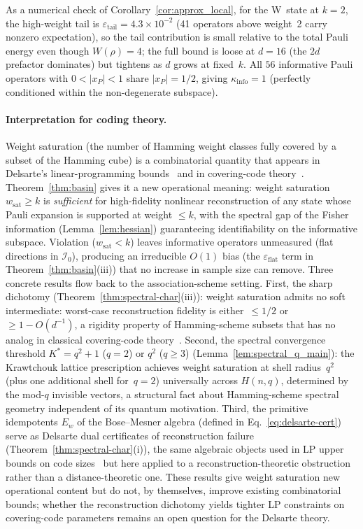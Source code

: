 \documentclass[twocolumn,prx,aps,superscriptaddress,longbibliography,floatfix]{revtex4-2}
\begin{document}
\noindent
As a numerical check of Corollary~\ref{cor:approx_local},
for the W~state at $k = 2$, the high-weight tail is
$\varepsilon_{\mathrm{tail}} = 4.3 \times 10^{-2}$
(41 operators above weight~2 carry nonzero expectation),
so the tail contribution is small relative to the total
Pauli energy even though $W(\rho) = 4$; the full bound is
loose at $d = 16$ (the $2d$ prefactor dominates) but
tightens as $d$ grows at fixed~$k$.
All $56$ informative Pauli operators with
$0 < |x_P| < 1$ share $|x_P| = 1/2$, giving
$\kappa_{\mathrm{info}} = 1$ (perfectly conditioned
within the non-degenerate subspace).

\paragraph{Interpretation for coding theory.}
Weight saturation (the number of Hamming weight classes fully
covered by a subset of the Hamming cube) is a combinatorial
quantity that appears in Delsarte's linear-programming
bounds~\cite{Delsarte1973,BannaiIto1984} and in covering-code
theory~\cite{MacWilliams1977}.
Theorem~\ref{thm:basin} gives it a new operational meaning:
weight saturation $w_{\mathrm{sat}} \ge k$ is \emph{sufficient}
for high-fidelity nonlinear reconstruction of any state whose Pauli
expansion is supported at weight $\le k$, with the spectral gap of
the Fisher information (Lemma~\ref{lem:hessian}) guaranteeing
identifiability on the informative subspace.  Violation ($w_{\mathrm{sat}} < k$) leaves
informative operators unmeasured (flat directions in
$\mathcal{I}_0$), producing an irreducible $O(1)$ bias
(the $\varepsilon_{\mathrm{flat}}$ term in
Theorem~\ref{thm:basin}(iii)) that no increase in sample size
can remove.
Three concrete results flow back to the association-scheme
setting.  First, the sharp dichotomy
(Theorem~\ref{thm:spectral-char}(iii)): weight saturation
admits no soft intermediate: worst-case reconstruction fidelity
is either~$\le 1/2$ or~$\ge 1 - O(d^{-1})$, a rigidity
property of Hamming-scheme subsets that has no analog in
classical covering-code
theory~\cite{Delsarte1973,MacWilliams1977}.
Second, the spectral convergence threshold $K^* = q^2 + 1$ ($q = 2$)
or $q^2$ ($q \ge 3$)
(Lemma~\ref{lem:spectral_q_main}): the Krawtchouk lattice
prescription achieves weight saturation at shell radius~$q^2$
(plus one additional shell for~$q = 2$)
universally across $H(n,q)$, determined by the mod-$q$ invisible
vectors, a structural fact about Hamming-scheme spectral geometry
independent of its quantum motivation.
Third, the primitive idempotents $E_w$ of the Bose--Mesner algebra
(defined in Eq.~\ref{eq:delsarte-cert})
serve as Delsarte dual certificates of reconstruction failure
(Theorem~\ref{thm:spectral-char}(i)), the same algebraic objects
used in LP upper bounds on code sizes~\cite{Delsarte1973} but here
applied to a reconstruction-theoretic obstruction rather than a
distance-theoretic one.
These results give weight saturation new operational content but
do not, by themselves, improve existing combinatorial bounds;
whether the reconstruction dichotomy yields tighter LP constraints
on covering-code parameters remains an open question for the
Delsarte theory.
\end{document}
